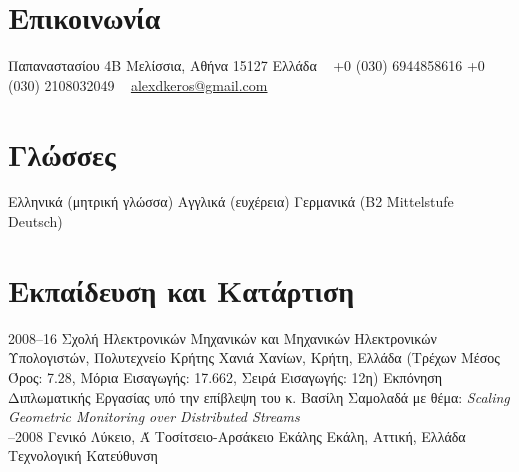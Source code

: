 \documentclass[print]{keros-cv} %
\begin{document}


\begin{aside} %
\section{Επικοινωνία}
Παπαναστασίου 4Β
Μελίσσια, Αθήνα 15127
Ελλάδα
~
+0 (030) 6944858616
+0 (030) 2108032049
~
\href{mailto:alexdkeros@gmail.com}{alexdkeros@gmail.com}
\section{Γλώσσες}
Ελληνικά (μητρική γλώσσα)
Αγγλικά (ευχέρεια)
Γερμανικά (B2 Mittelstufe Deutsch)
\end{aside}


\section{Εκπαίδευση και Κατάρτιση}

\begin{entrylist}
\entry
{2008--16}
{Σχολή Ηλεκτρονικών Μηχανικών και Μηχανικών Ηλεκτρονικών Υπολογιστών, Πολυτεχνείο Κρήτης}
{Χανιά Χανίων, Κρήτη, Ελλάδα}
{(Τρέχων Μέσος Όρος: 7.28, Μόρια Εισαγωγής: 17.662, Σειρά Εισαγωγής: 12η)
Εκπόνηση Διπλωματικής Εργασίας υπό την επίβλεψη του κ. Βασίλη Σαμολαδά με θέμα: \emph{Scaling Geometric Monitoring over Distributed Streams}\\}
\entry
{--2008}
{Γενικό Λύκειο, Ά Τοσίτσειο-Αρσάκειο Εκάλης}
{Εκάλη, Αττική, Ελλάδα}
{Τεχνολογική Κατεύθυνση}
\end{entrylist}

\end{document}
